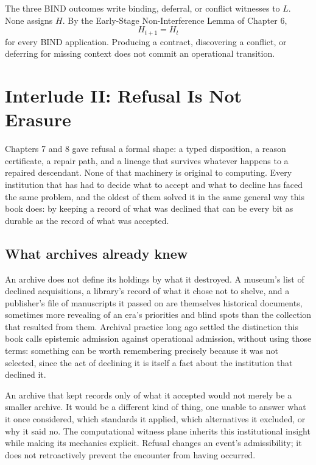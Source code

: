 \documentclass[11pt,openany]{book}
\newcommand{\interlude}{\cleardoublepage}
\begin{document}
The three BIND outcomes write binding, deferral, or conflict witnesses to
\(L\). None assigns \(H\). By the Early-Stage Non-Interference Lemma of Chapter
6,
\[
 H_{t+1}=H_t
\]
for every BIND application. Producing a contract, discovering a conflict, or
deferring for missing context does not commit an operational transition.

\interlude
\chapter*{Interlude II: Refusal Is Not Erasure}

Chapters 7 and 8 gave refusal a formal shape: a typed disposition, a reason
certificate, a repair path, and a lineage that survives whatever happens to a
repaired descendant. None of that machinery is original to computing. Every
institution that has had to decide what to accept and what to decline has
faced the same problem, and the oldest of them solved it in the same general
way this book does: by keeping a record of what was declined that can be every
bit as durable as the record of what was accepted.

\section*{What archives already knew}

An archive does not define its holdings by what it destroyed. A museum's list
of declined acquisitions, a library's record of what it chose not to shelve,
and a publisher's file of manuscripts it passed on are themselves historical
documents, sometimes more revealing of an era's priorities and blind spots
than the collection that resulted from them. Archival practice long ago
settled the distinction this book calls epistemic admission against
operational admission, without using those terms: something can be worth
remembering precisely because it was not selected, since the act of declining
it is itself a fact about the institution that declined it.

An archive that kept records only of what it accepted would not merely be a
smaller archive. It would be a different kind of thing, one unable to answer
what it once considered, which standards it applied, which alternatives it
excluded, or why it said no. The computational witness plane inherits this
institutional insight while making its mechanics explicit. Refusal changes an
event's admissibility; it does not retroactively prevent the encounter from
having occurred.
\end{document}
